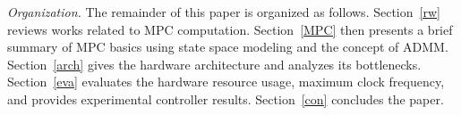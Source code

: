 %    

\textit{Organization.}
The remainder of this paper is organized as follows. Section~\ref{rw} reviews works related 
to MPC computation. Section~\ref{MPC} then presents a brief summary of MPC basics using state space modeling and the concept of ADMM. Section~\ref{arch} gives the hardware architecture and analyzes its bottlenecks. Section~\ref{eva} evaluates the hardware resource usage, maximum clock frequency, and provides experimental controller results. Section~\ref{con} concludes the paper.